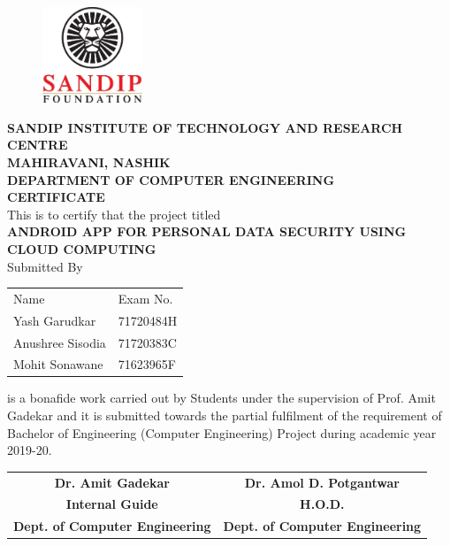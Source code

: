 \documentclass[12pt,a4paper]{report}
\begin{document}
\newpage
\begin{center}
\thispagestyle{empty}
\begin{figure}[h]
\begin{center}
\includegraphics[width=3cm, angle=0]{sandiplogo.jpg}
\end{center}
\end{figure}
\large{\textbf{SANDIP INSTITUTE OF TECHNOLOGY AND RESEARCH CENTRE}}\\
\large{\textbf{MAHIRAVANI, NASHIK}}\\[0.3cm]
\large{\textbf{DEPARTMENT OF COMPUTER ENGINEERING}}\\
\Large{\textbf{CERTIFICATE}}\\
This is to certify that the project titled\\
\large{\textsc {\textbf{ANDROID APP FOR PERSONAL DATA SECURITY USING CLOUD COMPUTING}}}\\[0.4cm]
Submitted By
\begin{table}[h]
\centering
\large{
\begin{tabular}{ll}
Name & Exam No.\\
Yash Garudkar & 71720484H\\
Anushree Sisodia & 71720383C\\
Mohit Sonawane & 71623965F\\
\end{tabular}
}
\end{table}
\justify
is a bonafide work carried out by Students under the supervision of Prof. Amit Gadekar
and it is submitted towards the partial fulfilment of the requirement of Bachelor of
Engineering (Computer Engineering) Project during academic year 2019-20.\\

\begin{table}[h]
\centering
\begin{tabular}{cc}

\textbf{Dr. Amit Gadekar}  \hspace{40pt}       &  \textbf{Dr. Amol D. Potgantwar}  \\
\textbf{Internal Guide }         \hspace{40pt}       &\textbf{ H.O.D.              }          \\
\textbf{Dept. of Computer Engineering}  \hspace{40pt}  & \textbf{Dept. of Computer Engineering}
\end{tabular}
\end{table}
\end{center}
\end{document}
